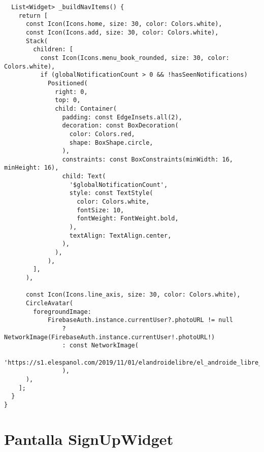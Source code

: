 \begin{verbatim}
  List<Widget> _buildNavItems() {
    return [
      const Icon(Icons.home, size: 30, color: Colors.white),
      const Icon(Icons.add, size: 30, color: Colors.white), 
      Stack(
        children: [
          const Icon(Icons.menu_book_rounded, size: 30, color: Colors.white),
          if (globalNotificationCount > 0 && !hasSeenNotifications)
            Positioned(
              right: 0,
              top: 0,
              child: Container(
                padding: const EdgeInsets.all(2),
                decoration: const BoxDecoration(
                  color: Colors.red,
                  shape: BoxShape.circle,
                ),
                constraints: const BoxConstraints(minWidth: 16, minHeight: 16),
                child: Text(
                  '$globalNotificationCount',
                  style: const TextStyle(
                    color: Colors.white,
                    fontSize: 10,
                    fontWeight: FontWeight.bold,
                  ),
                  textAlign: TextAlign.center,
                ),
              ),
            ),
        ],
      ),

      const Icon(Icons.line_axis, size: 30, color: Colors.white),
      CircleAvatar(
        foregroundImage:
            FirebaseAuth.instance.currentUser?.photoURL != null
                ? NetworkImage(FirebaseAuth.instance.currentUser!.photoURL!)
                : const NetworkImage(
                  'https://s1.elespanol.com/2019/11/01/elandroidelibre/el_androide_libre_441218515_179632866_1024x576.jpg',
                ),
      ),
    ];
  }
}
\end{verbatim}



\newpage
\section{Pantalla SignUpWidget}
\label{anexo:alg8}

